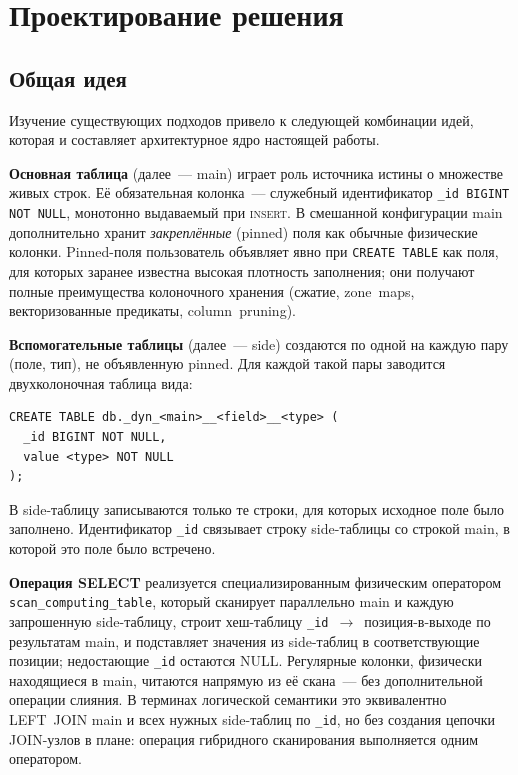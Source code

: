 \chapter{Проектирование решения}

\section{Общая идея}

Изучение существующих подходов привело к следующей комбинации
идей, которая и составляет архитектурное ядро настоящей работы.

\textbf{Основная таблица} (далее~--- main) играет роль источника
истины о множестве живых строк. Её обязательная колонка~---
служебный идентификатор \texttt{\_id BIGINT NOT NULL}, монотонно
выдаваемый при \textsc{insert}. В смешанной конфигурации main
дополнительно хранит \emph{закреплённые} (pinned) поля как обычные
физические колонки. Pinned-поля пользователь объявляет явно при
\texttt{CREATE TABLE} как поля, для которых заранее известна
высокая плотность заполнения; они получают полные преимущества
колоночного хранения (сжатие, zone~maps, векторизованные предикаты,
column~pruning).

\textbf{Вспомогательные таблицы} (далее~--- side) создаются по
одной на каждую пару (поле, тип), не объявленную pinned. Для каждой
такой пары заводится двухколоночная таблица вида:
\begin{verbatim}
CREATE TABLE db._dyn_<main>__<field>__<type> (
  _id BIGINT NOT NULL,
  value <type> NOT NULL
);
\end{verbatim}
В side-таблицу записываются только те строки, для которых исходное
поле было заполнено. Идентификатор \texttt{\_id} связывает строку
side-таблицы со строкой main, в которой это поле было встречено.

\textbf{Операция SELECT} реализуется специализированным
физическим оператором \texttt{scan\_computing\_table}, который
сканирует параллельно main и каждую запрошенную side-таблицу,
строит хеш-таблицу \texttt{\_id}~$\to$~позиция-в-выходе по
результатам main, и подставляет значения из side-таблиц в
соответствующие позиции; недостающие \texttt{\_id} остаются
NULL. Регулярные колонки, физически находящиеся в main,
читаются напрямую из её скана~--- без дополнительной операции
слияния. В терминах логической семантики это эквивалентно
LEFT~JOIN main и всех нужных side-таблиц по \texttt{\_id}, но без
создания цепочки JOIN-узлов в плане: операция гибридного сканирования
выполняется одним оператором.

